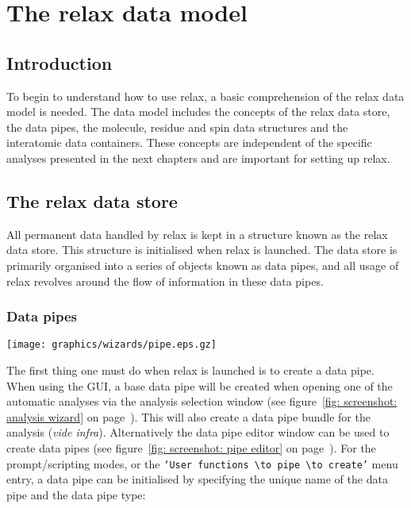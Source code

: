 
\chapter{The relax data model}



\section{Introduction}

To begin to understand how to use relax, a basic comprehension of the relax data model is needed.  The data model includes the concepts of the relax data store, the data pipes, the molecule, residue and spin data structures and the interatomic data containers.  These concepts are independent of the specific analyses presented in the next chapters and are important for setting up relax.




\section{The relax data store}

All permanent data handled by relax is kept in a structure known as the relax data store.  This structure is initialised when relax is launched.  The data store is primarily organised into a series of objects known as data pipes, and all usage of relax revolves around the flow of information in these data pipes.



\subsection{Data pipes}

\begin{figure*}[h]
\texttt{[image: graphics/wizards/pipe.eps.gz]}
\end{figure*}

The first thing one must do when relax is launched is to create a data pipe.  When using the GUI, a base data pipe will be created when opening one of the automatic analyses via the analysis selection window (see figure~\ref{fig: screenshot: analysis wizard} on page~\pageref{fig: screenshot: analysis wizard}).  This will also create a data pipe bundle for the analysis (\textit{vide infra}).  Alternatively the data pipe editor window can be used to create data pipes (see figure~\ref{fig: screenshot: pipe editor} on page~\pageref{fig: screenshot: pipe editor}).  For the prompt/scripting modes, or the \texttt{`User functions $\to$ pipe $\to$ create'} menu entry, a data pipe can be initialised by specifying the unique name of the data pipe and the data pipe type:

